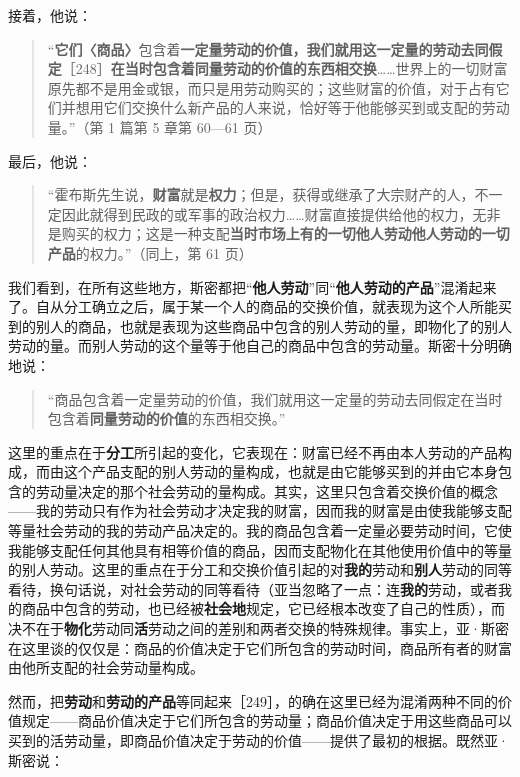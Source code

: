 接着，他说：

\begin{quote}“\textbf{它们〈商品〉}包含着\textbf{一定量劳动的价值，我们就用这一定量的劳动去同假定}［248］\textbf{在当时包含着同量劳动的价值的东西相交换}……世界上的一切财富原先都不是用金或银，而只是用劳动购买的；这些财富的价值，对于占有它们并想用它们交换什么新产品的人来说，恰好等于他能够买到或支配的劳动量。”（第 1 篇第 5 章第 60—61 页）\end{quote}

最后，他说：

\begin{quote}“霍布斯先生说，\textbf{财富}就是\textbf{权力}；但是，获得或继承了大宗财产的人，不一定因此就得到民政的或军事的政治权力……财富直接提供给他的权力，无非是购买的权力；这是一种支配\textbf{当时市场上有的一切他人劳动他人劳动的一切产品}的权力。”（同上，第 61 页）\end{quote}

我们看到，在所有这些地方，斯密都把“\textbf{他人劳动}”同“\textbf{他人劳动的产品}”混淆起来了。自从分工确立之后，属于某一个人的商品的交换价值，就表现为这个人所能买到的别人的商品，也就是表现为这些商品中包含的别人劳动的量，即物化了的别人劳动的量。而别人劳动的这个量等于他自己的商品中包含的劳动量。斯密十分明确地说：

\begin{quote}“商品包含着一定量劳动的价值，我们就用这一定量的劳动去同假定在当时包含着\textbf{同量劳动的价值}的东西相交换。”\end{quote}

这里的重点在于\textbf{分工}所引起的变化，它表现在：财富已经不再由本人劳动的产品构成，而由这个产品支配的别人劳动的量构成，也就是由它能够买到的并由它本身包含的劳动量决定的那个社会劳动的量构成。其实，这里只包含着交换价值的概念——我的劳动只有作为社会劳动才决定我的财富，因而我的财富是由使我能够支配等量社会劳动的我的劳动产品决定的。我的商品包含着一定量必要劳动时间，它使我能够支配任何其他具有相等价值的商品，因而支配物化在其他使用价值中的等量的别人劳动。这里的重点在于分工和交换价值引起的对\textbf{我的}劳动和\textbf{别人}劳动的同等看待，换句话说，对社会劳动的同等看待（亚当忽略了一点：连\textbf{我的}劳动，或者我的商品中包含的劳动，也已经被\textbf{社会地}规定，它已经根本改变了自己的性质），而决不在于\textbf{物化}劳动同\textbf{活}劳动之间的差别和两者交换的特殊规律。事实上，亚·斯密在这里谈的仅仅是：商品的价值决定于它们所包含的劳动时间，商品所有者的财富由他所支配的社会劳动量构成。

然而，把\textbf{劳动}和\textbf{劳动的产品}等同起来［249］，的确在这里已经为混淆两种不同的价值规定——商品价值决定于它们所包含的劳动量；商品价值决定于用这些商品可以买到的活劳动量，即商品价值决定于劳动的价值——提供了最初的根据。既然亚·斯密说：

